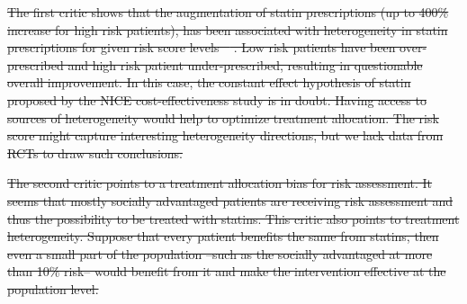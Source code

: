 \documentclass[10pt,letterpaper]{article}
\providecommand{\DIFdeltex}[1]{{\protect\color{red}\sout{#1}}}                      %
\providecommand{\DIFdelbegin}{} %
\providecommand{\DIFdelend}{} %
\providecommand{\DIFdel}[1]{\texorpdfstring{\DIFdeltex{#1}}{}} %
\newcommand{\DIFscaledelfig}{0.5}
\newlength{\DIFdelgraphicswidth} %
\newlength{\DIFdelgraphicsheight} %
\newcommand{\DIFdelincludegraphics}[2][]{%
\sbox{\DIFdelgraphicsbox}{\DIFOincludegraphics[#1]{#2}}%
\settoboxwidth{\DIFdelgraphicswidth}{\DIFdelgraphicsbox} %
\settoboxtotalheight{\DIFdelgraphicsheight}{\DIFdelgraphicsbox} %
\scalebox{\DIFscaledelfig}{%
\parbox[b]{\DIFdelgraphicswidth}{\usebox{\DIFdelgraphicsbox}\\[-\baselineskip] \rule{\DIFdelgraphicswidth}{0em}}\llap{\resizebox{\DIFdelgraphicswidth}{\DIFdelgraphicsheight}{%
\setlength{\unitlength}{\DIFdelgraphicswidth}%
\begin{picture}(1,1)%
\thicklines\linethickness{2pt} %
{\color[rgb]{1,0,0}\put(0,0){\framebox(1,1){}}}%
{\color[rgb]{1,0,0}\put(0,0){\line( 1,1){1}}}%
{\color[rgb]{1,0,0}\put(0,1){\line(1,-1){1}}}%
\end{picture}%
}\hspace*{3pt}}} %
} %
\DeclareRobustCommand{\DIFdelbegin}{\DIFOdelbegin \let\includegraphics\DIFdelincludegraphics} %
\DeclareRobustCommand{\DIFdelend}{\DIFOaddend \let\includegraphics\DIFOincludegraphics} %
\begin{document}
\DIFdelbegin %
\DIFdel{The first critic shows that the augmentation of statin prescriptions
  (up to 400\% increase for high risk patients), has been associated with
  heterogeneity in statin prescriptions for given risk score levels
  \mbox{%
    \cite{van2013efficiency}}\hskip0pt%
  . Low risk patients have been over-prescribed
  and high risk patient under-prescribed, resulting in questionable overall
  improvement. In this case, the constant effect
  hypothesis of statin proposed by the NICE cost-effectiveness study is in doubt.
  Having access to sources of heterogeneity would help to optimize
  treatment allocation. The risk score might capture interesting
  heterogeneity directions, but we lack data from RCTs to draw such conclusions.
}\DIFdelend %

\DIFdelbegin %
\DIFdel{The second critic points to a treatment allocation bias for risk
  assessment. It seems that mostly socially advantaged patients are
  receiving risk assessment and thus the possibility to be treated with
  statins. This critic also points to treatment heterogeneity.
  Suppose that every patient benefits the same from statins, then even a
  small part of the population --such as the socially advantaged at more
  than 10\% risk-- would benefit from it and make the intervention
  effective at the population level.
}%
\DIFdelend %
\end{document}

